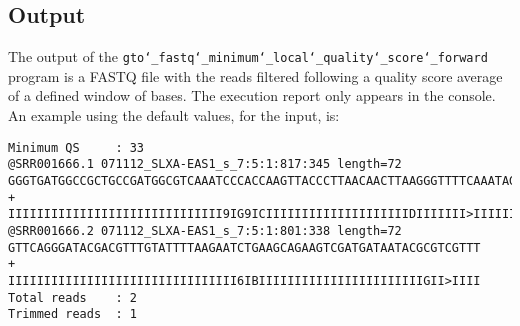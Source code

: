 \subsection*{Output}
The output of the \texttt{gto\char`_fastq\char`_minimum\char`_local\char`_quality\char`_score\char`_forward} program is a FASTQ file with the reads filtered following a quality score average of a defined window of bases.
The execution report only appears in the console.\\
An example using the default values, for the input, is:
\begin{lstlisting}
Minimum QS     : 33
@SRR001666.1 071112_SLXA-EAS1_s_7:5:1:817:345 length=72
GGGTGATGGCCGCTGCCGATGGCGTCAAATCCCACCAAGTTACCCTTAACAACTTAAGGGTTTTCAAATAGA
+
IIIIIIIIIIIIIIIIIIIIIIIIIIIIII9IG9ICIIIIIIIIIIIIIIIIIIIIDIIIIIII>IIIIII/
@SRR001666.2 071112_SLXA-EAS1_s_7:5:1:801:338 length=72
GTTCAGGGATACGACGTTTGTATTTTAAGAATCTGAAGCAGAAGTCGATGATAATACGCGTCGTTT
+
IIIIIIIIIIIIIIIIIIIIIIIIIIIIIIII6IBIIIIIIIIIIIIIIIIIIIIIIIGII>IIII
Total reads    : 2
Trimmed reads  : 1
\end{lstlisting}